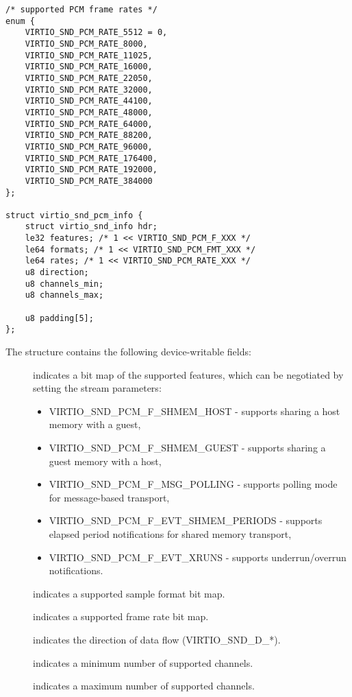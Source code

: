 \begin{lstlisting}
/* supported PCM frame rates */
enum {
    VIRTIO_SND_PCM_RATE_5512 = 0,
    VIRTIO_SND_PCM_RATE_8000,
    VIRTIO_SND_PCM_RATE_11025,
    VIRTIO_SND_PCM_RATE_16000,
    VIRTIO_SND_PCM_RATE_22050,
    VIRTIO_SND_PCM_RATE_32000,
    VIRTIO_SND_PCM_RATE_44100,
    VIRTIO_SND_PCM_RATE_48000,
    VIRTIO_SND_PCM_RATE_64000,
    VIRTIO_SND_PCM_RATE_88200,
    VIRTIO_SND_PCM_RATE_96000,
    VIRTIO_SND_PCM_RATE_176400,
    VIRTIO_SND_PCM_RATE_192000,
    VIRTIO_SND_PCM_RATE_384000
};

struct virtio_snd_pcm_info {
    struct virtio_snd_info hdr;
    le32 features; /* 1 << VIRTIO_SND_PCM_F_XXX */
    le64 formats; /* 1 << VIRTIO_SND_PCM_FMT_XXX */
    le64 rates; /* 1 << VIRTIO_SND_PCM_RATE_XXX */
    u8 direction;
    u8 channels_min;
    u8 channels_max;

    u8 padding[5];
};
\end{lstlisting}

The structure contains the following device-writable fields:

\begin{description}
\item[] indicates a bit map of the supported features, which can
be negotiated by setting the stream parameters:
\begin{itemize}
\item VIRTIO_SND_PCM_F_SHMEM_HOST - supports sharing a host memory with a guest,
\item VIRTIO_SND_PCM_F_SHMEM_GUEST - supports sharing a guest memory with a host,
\item VIRTIO_SND_PCM_F_MSG_POLLING - supports polling mode for message-based
transport,
\item VIRTIO_SND_PCM_F_EVT_SHMEM_PERIODS - supports elapsed period notifications
for shared memory transport,
\item VIRTIO_SND_PCM_F_EVT_XRUNS - supports underrun/overrun notifications.
\end{itemize}
\item[] indicates a supported sample format bit map.
\item[] indicates a supported frame rate bit map.
\item[] indicates the direction of data flow (VIRTIO_SND_D_*).
\item[] indicates a minimum number of supported channels.
\item[] indicates a maximum number of supported channels.
\end{description}

